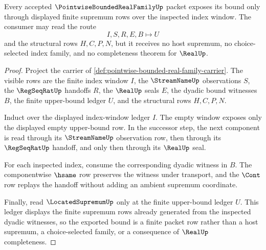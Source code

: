 \begin{theorem}
\label{thm:pointwise-bounded-real-family-finite-supremum-obligation}
Every accepted $\PointwiseBoundedRealFamilyUp$ packet exposes its bound only through displayed finite supremum rows over the inspected index window. The consumer may read the route
$$
I,S,R,E,B\longmapsto U
$$
and the structural rows $H,C,P,N$, but it receives no host supremum, no choice-selected index family, and no completeness theorem for $\RealUp$.
\end{theorem}
\begin{proof}
Project the carrier of \autoref{def:pointwise-bounded-real-family-carrier}. The visible rows are the finite index window $I$, the $\StreamNameUp$ observations $S$, the $\RegSeqRatUp$ handoffs $R$, the $\RealUp$ seals $E$, the dyadic bound witnesses $B$, the finite upper-bound ledger $U$, and the structural rows $H,C,P,N$.

Induct over the displayed index-window ledger $I$. The empty window exposes only the displayed empty upper-bound row. In the successor step, the next component is read through its $\StreamNameUp$ observation row, then through its $\RegSeqRatUp$ handoff, and only then through its $\RealUp$ seal.

For each inspected index, consume the corresponding dyadic witness in $B$. The componentwise $\hsame$ row preserves the witness under transport, and the $\Cont$ row replays the handoff without adding an ambient supremum coordinate.

Finally, read $\LocatedSupremumUp$ only at the finite upper-bound ledger $U$. This ledger displays the finite supremum rows already generated from the inspected dyadic witnesses, so the exported bound is a finite packet row rather than a host supremum, a choice-selected family, or a consequence of $\RealUp$ completeness.
\end{proof}



